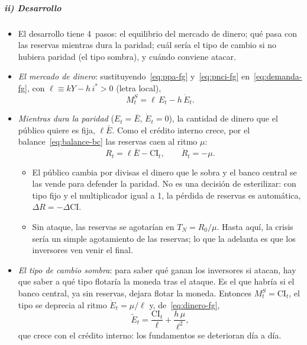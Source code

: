 \documentclass[11pt]{article}
\begin{document}
\subparagraph{ii) Desarrollo}

\begin{itemize}
\item El desarrollo tiene 4~pasos: el equilibrio del mercado de dinero; qué pasa con las reservas mientras dura la paridad; cuál sería el tipo de cambio si no hubiera paridad (el tipo sombra), y cuándo conviene atacar.
\item \emph{El mercado de dinero}: sustituyendo~\eqref{eq:ppa-fg} y~\eqref{eq:pnci-fg} en~\eqref{eq:demanda-fg}, con $\ell\equiv kY-h\,i^*>0$ (letra local),
  \begin{equation}\label{eq:dinero-fg}
  M^S_t=\ell\,E_t-h\,\dot E_t .
  \end{equation}
\item \emph{Mientras dura la paridad} ($E_t=\bar E$, $\dot E_t=0$), la cantidad de dinero que el público quiere es fija, $\ell\bar E$. Como el crédito interno crece, por el balance~\eqref{eq:balance-bc} las reservas caen al ritmo $\mu$:
  \begin{equation}\label{eq:reservas-fg}
  R_t=\ell\bar E-\mathrm{CI}_t ,\qquad \dot R_t=-\mu .
  \end{equation}
  \begin{itemize}
  \item El público cambia por divisas el dinero que le sobra y el banco central se las vende para defender la paridad. No es una decisión de esterilizar: con tipo fijo y el multiplicador igual a 1, la pérdida de reservas es automática, $\Delta R=-\Delta\mathrm{CI}$.
  \item Sin ataque, las reservas se agotarían en $T_N=R_0/\mu$. Hasta aquí, la crisis sería un simple agotamiento de las reservas; lo que la adelanta es que los inversores ven venir el final.
  \end{itemize}
\item \emph{El tipo de cambio sombra}: para saber qué ganan los inversores si atacan, hay que saber a qué tipo flotaría la moneda tras el ataque. Es el que habría si el banco central, ya sin reservas, dejara flotar la moneda. Entonces $M^S_t=\mathrm{CI}_t$, el tipo se deprecia al ritmo $\dot E_t=\mu/\ell$ y, de~\eqref{eq:dinero-fg},
  \begin{equation}\label{eq:tipo-sombra}
  \tilde E_t=\frac{\mathrm{CI}_t}{\ell}+\frac{h\,\mu}{\ell^{2}} ,
  \end{equation}
  que crece con el crédito interno: los fundamentos se deterioran día a día.

\end{itemize}
\end{document}
